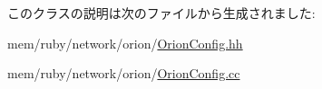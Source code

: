 このクラスの説明は次のファイルから生成されました:\begin{DoxyCompactItemize}
\item 
mem/ruby/network/orion/\hyperlink{OrionConfig_8hh}{OrionConfig.hh}\item 
mem/ruby/network/orion/\hyperlink{OrionConfig_8cc}{OrionConfig.cc}\end{DoxyCompactItemize}
